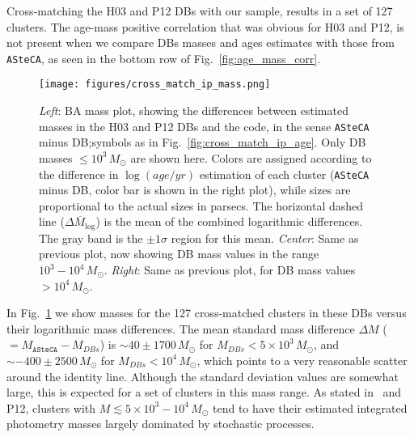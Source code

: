 \documentclass{aa}
\begin{document}
Cross-matching the H03 and P12 DBs with our sample, results in a
set of 127 clusters. The age-mass positive correlation that was obvious for H03
and P12, is not present when we compare DBs masses and ages estimates with
those from \texttt{ASteCA}, as seen in the bottom row of
Fig.~\ref{fig:age_mass_corr}.
%
\begin{figure*}
\texttt{[image: figures/cross\_match\_ip\_mass.png]}
\caption{\emph{Left}: BA mass plot, showing the differences between estimated
masses in the H03 and P12 DBs and the code, in the sense \texttt{ASteCA} minus
DB;\@ symbols as in Fig.~\ref{fig:cross_match_ip_age}.
Only DB masses ${\le}10^3\,M_{\odot}$ are shown here.
Colors are assigned according to the difference in $\log(age/yr)$ estimation of
each cluster (\texttt{ASteCA} minus DB, color bar is shown in the right plot),
while sizes are proportional to the actual sizes in parsecs.
The horizontal dashed line ($\overline{\Delta M_{\log}}$) is the mean of the
combined logarithmic differences. The gray band is the ${\pm}1\sigma$ region for
this mean.
\emph{Center}: Same as previous plot, now showing DB mass values in the range
$10^3-10^4\,M_{\odot}$.
\emph{Right}: Same as previous plot, for DB mass values ${>}10^4\,M_{\odot}$.
}
\label{fig:cross_match_ip_mass}
\end{figure*}
%
In Fig.~\ref{fig:cross_match_ip_mass} we show masses for the 127 cross-matched
clusters in these DBs versus their logarithmic mass differences.
%
The mean standard mass difference $\Delta M$ (${=}M_{\mathtt{ASteCA}}-M_{DBs}$)
is ${\sim}40{\pm}1700\,M_{\odot}$ for $M_{DBs} {<}5{\times}10^3\,M_{\odot}$,
and ${\sim-}400{\pm}2500\,M_{\odot}$ for $M_{DBs} {<}10^4\,M_{\odot}$, which  points
to a very reasonable scatter around the identity line.
%
Although the standard deviation values are somewhat large, this is expected for
a set of clusters in this mass range. As stated in~\cite{Baumgardt_2013} and
P12, clusters with $M{\lesssim}5{\times}10^3 - 10^4\,M_{\odot}$ tend to have
their estimated integrated photometry masses largely dominated by
stochastic processes.
\end{document}
